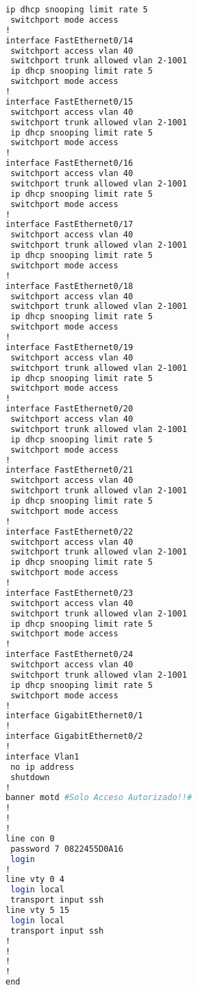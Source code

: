 \begin{lstlisting}[language=Bash, caption={Configuración Completa Switch Urologia}]
 ip dhcp snooping limit rate 5
 switchport mode access
!
interface FastEthernet0/14
 switchport access vlan 40
 switchport trunk allowed vlan 2-1001
 ip dhcp snooping limit rate 5
 switchport mode access
!
interface FastEthernet0/15
 switchport access vlan 40
 switchport trunk allowed vlan 2-1001
 ip dhcp snooping limit rate 5
 switchport mode access
!
interface FastEthernet0/16
 switchport access vlan 40
 switchport trunk allowed vlan 2-1001
 ip dhcp snooping limit rate 5
 switchport mode access
!
interface FastEthernet0/17
 switchport access vlan 40
 switchport trunk allowed vlan 2-1001
 ip dhcp snooping limit rate 5
 switchport mode access
!
interface FastEthernet0/18
 switchport access vlan 40
 switchport trunk allowed vlan 2-1001
 ip dhcp snooping limit rate 5
 switchport mode access
!
interface FastEthernet0/19
 switchport access vlan 40
 switchport trunk allowed vlan 2-1001
 ip dhcp snooping limit rate 5
 switchport mode access
!
interface FastEthernet0/20
 switchport access vlan 40
 switchport trunk allowed vlan 2-1001
 ip dhcp snooping limit rate 5
 switchport mode access
!
interface FastEthernet0/21
 switchport access vlan 40
 switchport trunk allowed vlan 2-1001
 ip dhcp snooping limit rate 5
 switchport mode access
!
interface FastEthernet0/22
 switchport access vlan 40
 switchport trunk allowed vlan 2-1001
 ip dhcp snooping limit rate 5
 switchport mode access
!
interface FastEthernet0/23
 switchport access vlan 40
 switchport trunk allowed vlan 2-1001
 ip dhcp snooping limit rate 5
 switchport mode access
!
interface FastEthernet0/24
 switchport access vlan 40
 switchport trunk allowed vlan 2-1001
 ip dhcp snooping limit rate 5
 switchport mode access
!
interface GigabitEthernet0/1
!
interface GigabitEthernet0/2
!
interface Vlan1
 no ip address
 shutdown
!
banner motd #Solo Acceso Autorizado!!#
!
!
!
line con 0
 password 7 0822455D0A16
 login
!
line vty 0 4
 login local
 transport input ssh
line vty 5 15
 login local
 transport input ssh
!
!
!
!
end
\end{lstlisting}
